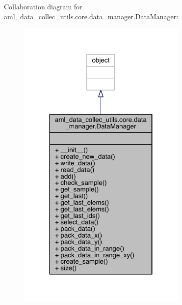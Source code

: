 Collaboration diagram for aml\+\_\+data\+\_\+collec\+\_\+utils.\+core.\+data\+\_\+manager.\+Data\+Manager\+:
\nopagebreak
\begin{figure}[H]
\begin{center}
\leavevmode
\includegraphics[width=236pt]{classaml__data__collec__utils_1_1core_1_1data__manager_1_1_data_manager__coll__graph}
\end{center}
\end{figure}
